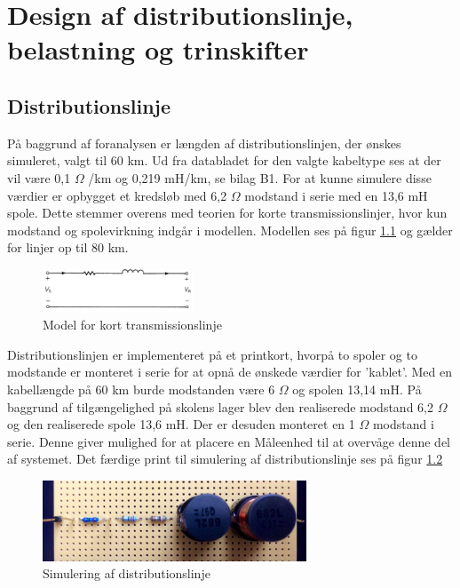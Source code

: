 
\chapter{Design af distributionslinje, belastning og trinskifter}

\section{Distributionslinje}
På baggrund af foranalysen er længden af distributionslinjen, der ønskes simuleret, valgt til 60 km. Ud fra databladet for den valgte kabeltype ses at der  vil være 0,1 $\Omega$ /km og 0,219 mH/km, se bilag B1. For at kunne simulere disse værdier er opbygget et kredsløb med 6,2 $\Omega$ modstand i serie med en 13,6 mH spole. Dette stemmer overens med teorien for korte transmissionslinjer, hvor kun modstand og spolevirkning indgår i modellen. Modellen ses på figur \ref{fig:Kortlinjemodel} og gælder for linjer op til 80 km. \cite{DisbTeori}

\begin{figure}[htbp] %
	\centering
	\includegraphics[width=0.4\textwidth]{Figure/Kortlinjemodel2}
	\caption{Model for kort transmissionslinje}
	\label{fig:Kortlinjemodel}
\end{figure}


Distributionslinjen er implementeret på et printkort, hvorpå to spoler og to modstande er monteret i serie for at opnå de ønskede værdier for 'kablet'. Med en kabellængde på 60 km burde modstanden være 6 $\Omega$ og spolen 13,14 mH. På baggrund af tilgængelighed på skolens lager blev den realiserede modstand 6,2 $\Omega$ og den realiserede spole 13,6 mH. Der er desuden monteret en 1 $\Omega$ modstand i serie. Denne giver mulighed for at placere en Måleenhed til at overvåge denne del af systemet. Det færdige print til simulering af distributionslinje ses på figur \ref{fig:Disblinje}

\begin{figure}[H] 
	\centering
	\includegraphics[width=0.7\textwidth]{Figure/Distributionslinje}
	\caption{Simulering af distributionslinje}
	\label{fig:Disblinje}
\end{figure}
